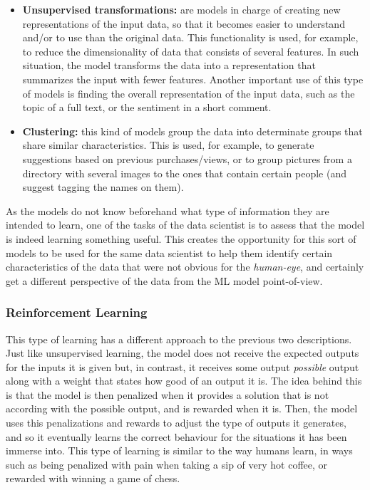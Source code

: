 \begin{itemize}
    \item \textbf{Unsupervised transformations:} are models in charge of creating new representations of the input data, so that it becomes easier to understand and/or to use than the original data. This functionality is used, for example, to reduce the dimensionality of data that consists of several features. In such situation, the model transforms the data into a representation that summarizes the input with fewer features. Another important use of this type of models is finding the overall representation of the input data, such as the topic of a full text, or the sentiment in a short comment.
    \item \textbf{Clustering:} this kind of models group the data into determinate groups that share similar characteristics. This is used, for example, to generate suggestions based on previous purchases/views, or to group pictures from a directory with several images to the ones that contain certain people (and suggest tagging the names on them).
\end{itemize}

As the models do not know beforehand what type of information they are intended to learn, one of the tasks of the data scientist is to assess that the model is indeed learning something useful. This creates the opportunity for this sort of models to be used for the same data scientist to help them identify certain characteristics of the data that were not obvious for the \emph{human-eye}, and certainly get a different perspective of the data from the \ac{ML} model point-of-view.

\subsubsection{Reinforcement Learning}
This type of learning has a different approach to the previous two descriptions. Just like unsupervised learning, the model does not receive the expected outputs for the inputs it is given but, in contrast, it receives some output \emph{possible} output along with a weight that states how good of an output it is. The idea behind this is that the model is then penalized when it provides a solution that is not according with the possible output, and is rewarded when it is. Then, the model uses this penalizations and rewards to adjust the type of outputs it generates, and so it eventually learns the correct behaviour for the situations it has been immerse into. This type of learning is similar to the way humans learn, in ways such as being penalized with pain when taking a sip of very hot coffee, or rewarded with winning a game of chess.\\

